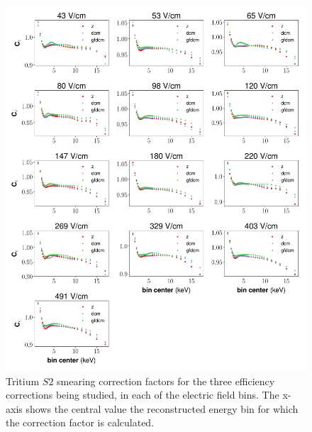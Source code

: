 \begin{figure}[h!]
\centering
\includegraphics[width=\textwidth]{Figures/H3_Ce_prelim.pdf}
\caption{Tritium $S2$ smearing correction factors for the three efficiency corrections being studied, in each of the electric field bins. The x-axis shows the central value the reconstructed energy bin for which the correction factor is calculated.}
\label{fig:H3_Ce_prelim}
\end{figure}

\clearpage
